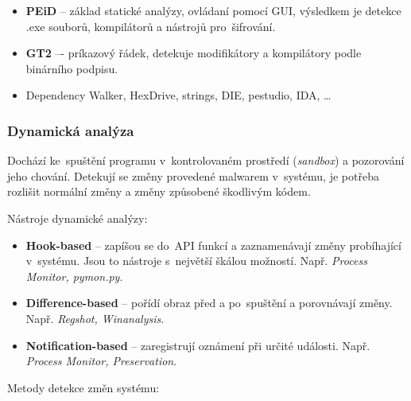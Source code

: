 \begin{itemize}
    \item \textbf{PEiD} -- základ statické analýzy, ovládaní pomocí GUI, výsledkem je detekce .exe souborů, kompilátorů a nástrojů pro~šifrování.
    \item \textbf{GT2} –- príkazový řádek, detekuje modifikátory a kompilátory podle binárního podpisu.
    \item Dependency Walker, HexDrive, strings, DIE, pestudio, IDA, \dots
\end{itemize}


\subsubsection{Dynamická analýza}

Dochází ke~spuštění programu v~kontrolovaném prostředí (\emph{sandbox}) a pozorování jeho chování.
Detekují se změny provedené malwarem v~systému, je potřeba rozlišit normální změny a změny způsobené škodlivým kódem.


Nástroje dynamické analýzy:

\begin{itemize}
    \item \textbf{Hook-based} -- zapíšou se do~API funkcí a zaznamenávají změny probíhající v~systému. Jsou to nástroje s~největší škálou možností.
    Např. \textit{Process Monitor, pymon.py}.
    \item \textbf{Difference-based} -- pořídí obraz před a po~spuštění a porovnávají změny.
    Např. \textit{Regshot, Winanalysis}.
    \item \textbf{Notification-based} -- zaregistrují oznámení při určité události.
    Např. \textit{Process Monitor, Preservation}.
\end{itemize}

Metody detekce změn systému:


